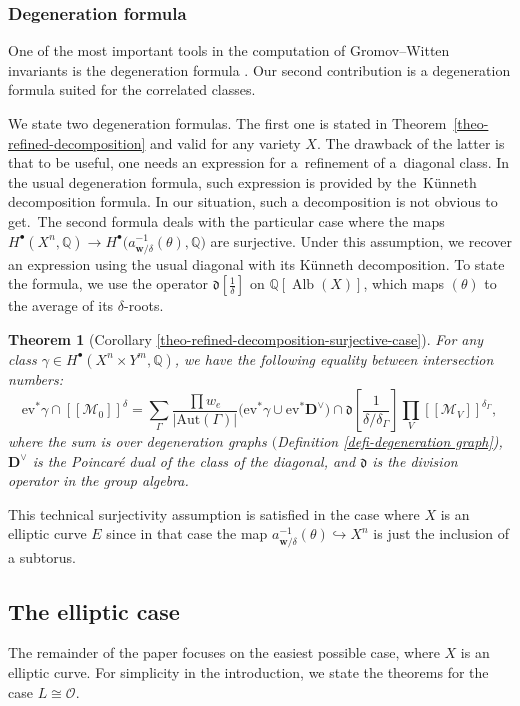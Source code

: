 \documentclass[pdftex]{sigma}
\newcommand{\fvir}[2]{[\![ #1 ]\!]^{#2}}
\newcommand{\ev}{\mathrm{ev}}
\renewcommand{\d}[1]{\dfk\left[ #1 \right]}
\newcommand{\Alb}{\operatorname{Alb}}
\newcommand{\QQ}{\mathbb{Q}}
\newcommand{\bfD}{ {\boldsymbol D} }
\newcommand{\bfw}{ {\boldsymbol w} }
\newcommand{\dfk}{\mathfrak{d}}
\newcommand{\M}{\mathcal{M}}
\renewcommand{\O}{\mathcal{O}}
\numberwithin{equation}{section}
\newtheorem*{theom}{Theorem}
\theoremstyle{definition}
\begin{document}
\subsubsection{Degeneration formula}
One of the most important tools in the computation of Gromov--Witten invariants is the degeneration formula \cite{kim2018degeneration,li2002degeneration,maulik2023logarithmic}. Our second contribution is a degeneration formula suited for the correlated classes.

We state two degeneration formulas. The first one is stated in Theorem~\ref{theo-refined-decomposition} and valid for any variety $X$. The drawback of the latter is that to be useful, one needs an expression for a~refinement of a~diagonal class. In the usual degeneration formula, such expression is provided by the~K\"unneth decomposition formula. In our situation, such a decomposition is not obvious to get.~The second formula deals with the particular case where the maps $H^\bullet(X^n,\QQ) \to  H^\bullet\bigl(a_{\bfw/\delta}^{-1}(\theta),\QQ\bigr)$ are surjective. Under this assumption, we recover an expression using the usual diagonal with its K\"unneth decomposition. To state the formula, we use the operator $\d{\frac{1}{\delta}}$ on $\QQ[\Alb(X)]$, which maps $(\theta)$ to the average of its $\delta$-roots.

\begin{theom}[Corollary \ref{theo-refined-decomposition-surjective-case}]
For any class $\gamma\in H^\bullet(X^n\times Y^m,\QQ)$, we have the following equality between intersection numbers:
\[ \ev^*\gamma\cap\fvir{\M_0}{\delta}
= \sum_\Gamma \frac{\prod w_e}{|\mathrm{Aut}(\Gamma)|}\bigl(\ev^*\gamma\cup\ev^*\bfD^\vee\bigr)\cap\d{\frac{1}{\delta/\delta_\Gamma}}\prod_V \fvir{\M_V}{\delta_\Gamma}, \]
where the sum is over degeneration graphs $($Definition {\rm\ref{defi-degeneration graph})}, $\bfD^\vee$ is the Poincar\'e dual of the class of the diagonal, and $\mathfrak{d}$ is the division operator in the group algebra.
\end{theom}

This technical surjectivity assumption is satisfied in the case where $X$ is an elliptic curve $E$ since in that case the map $a_{\bfw/\delta}^{-1}(\theta)\hookrightarrow X^n$ is just the inclusion of a subtorus.


\subsection{The elliptic case}
The remainder of the paper focuses on the easiest possible case, where $X$ is an elliptic curve. For simplicity in the introduction, we state the theorems for the case $L\cong\O$.
\end{document}
